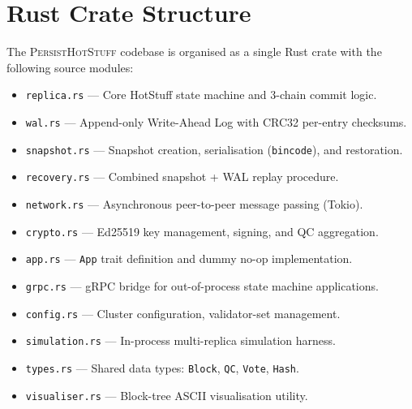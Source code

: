 \documentclass[a4paper,12pt,onecolumn]{report}
\newcommand{\persisthotstuff}{\textsc{PersistHotStuff}}
\begin{document}
\chapter{Rust Crate Structure}
\label{app:crate}

The \persisthotstuff{} codebase is organised as a single Rust crate with the
following source modules:

\begin{itemize}
  \item \texttt{replica.rs} --- Core HotStuff state machine and 3-chain commit logic.
  \item \texttt{wal.rs} --- Append-only Write-Ahead Log with CRC32 per-entry checksums.
  \item \texttt{snapshot.rs} --- Snapshot creation, serialisation (\texttt{bincode}), and restoration.
  \item \texttt{recovery.rs} --- Combined snapshot + WAL replay procedure.
  \item \texttt{network.rs} --- Asynchronous peer-to-peer message passing (Tokio).
  \item \texttt{crypto.rs} --- Ed25519 key management, signing, and QC aggregation.
  \item \texttt{app.rs} --- \texttt{App} trait definition and dummy no-op implementation.
  \item \texttt{grpc.rs} --- gRPC bridge for out-of-process state machine applications.
  \item \texttt{config.rs} --- Cluster configuration, validator-set management.
  \item \texttt{simulation.rs} --- In-process multi-replica simulation harness.
  \item \texttt{types.rs} --- Shared data types: \texttt{Block}, \texttt{QC}, \texttt{Vote}, \texttt{Hash}.
  \item \texttt{visualiser.rs} --- Block-tree ASCII visualisation utility.
\end{itemize}



\end{document}
